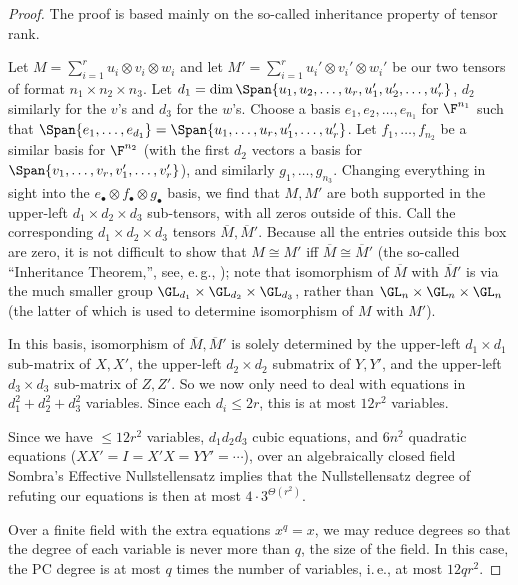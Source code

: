 \begin{proof}
The proof is based mainly on the so-called inheritance property of tensor rank.

Let $M = \sum_{i=1}^r u_i \otimes v_i \otimes w_i$ and let $M' = \sum_{i=1}^r u_i' \otimes v_i' \otimes w_i'$ be our two tensors of format $n_1 \times n_2 \times n_3$. Let $d_1 = \dim \Span\{u_1, u_2, \dotsc, u_r, u_1', u_2', \dotsc, u_r'\}$, $d_2$ similarly for the $v$'s and $d_3$ for the $w$'s. Choose a basis $e_1, e_2, \dotsc, e_{n_1}$ for $\F^{n_1}$ such that $\Span\{e_1, \dotsc, e_{d_1}\} = \Span\{u_1, \dotsc, u_r, u_1', \dotsc, u_r'\}$. Let $f_1, \dotsc, f_{n_2}$ be a similar basis for $\F^{n_2}$ (with the first $d_2$ vectors a basis for $\Span\{v_1, \dotsc, v_r, v_1', \dotsc, v_r'\}$), and similarly $g_1, \dotsc, g_{n_3}$. Changing everything in sight into the $e_{\bullet} \otimes f_{\bullet} \otimes g_{\bullet}$ basis, we find that $M,M'$ are both supported in the upper-left $d_1 \times d_2 \times d_3$ sub-tensors, with all zeros outside of this. Call the corresponding $d_1 \times d_2 \times d_3$ tensors $\overline{M}, \overline{M}'$. Because all the entries outside this box are zero, it is not difficult to show that $M \cong M'$ iff $\overline{M} \cong \overline{M}'$ (the so-called ``Inheritance Theorem,'', see, e.\,g., \cite[\S 3.7.1]{landsbergBook}); note that isomorphism of $\overline{M}$ with $\overline{M}'$ is via the much smaller group $\GL_{d_1} \times \GL_{d_2} \times \GL_{d_3}$, rather than $\GL_n \times \GL_n \times \GL_n$ (the latter of which is used to determine isomorphism of $M$ with $M'$).

In this basis, isomorphism of $\overline{M}, \overline{M}'$ is solely determined by the upper-left $d_1 \times d_1$ sub-matrix of $X, X'$, the upper-left $d_2 \times d_2$ submatrix of $Y, Y'$, and the upper-left $d_3 \times d_3$ sub-matrix of $Z, Z'$. So we now only need to deal with equations in $d_1^2 + d_2^2 + d_3^2$ variables. Since each $d_i \leq 2r$, this is at most $12r^2$ variables.

Since we have $\leq 12r^2$ variables, $d_1 d_2 d_3$ cubic equations, and $6n^2$ quadratic equations ($XX' = I = X'X = YY' = \dotsb$), over an algebraically closed field Sombra's Effective Nullstellensatz \cite{sombra} implies that the Nullstellensatz degree of refuting our equations is then at most $4 \cdot 3^{\Theta(r^2)}$. 

Over a finite field with the extra equations $x^q = x$, we may reduce degrees so that the degree of each variable is never more than $q$, the size of the field. In this case, the PC degree is at most $q$ times the number of variables, i.\,e., at most $12 q r^2$.
\end{proof}
